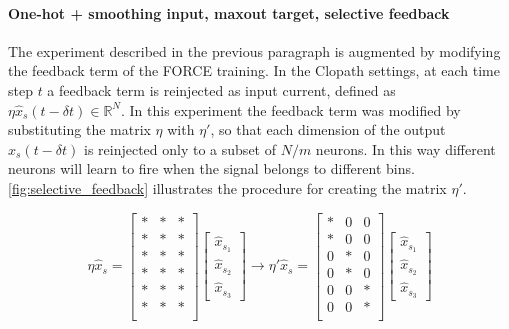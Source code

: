 \documentclass[10pt,a4paper, final]{report} %
\begin{document}
\paragraph{One-hot + smoothing input, maxout target, selective feedback}
The experiment described in the previous paragraph is augmented by modifying the feedback term of the FORCE training. In the Clopath settings, at each time step $t$ a feedback term is reinjected as input current, defined as $\eta \hat{x}_s(t-\delta t) \in \mathbb{R}^N$. In this experiment the feedback term was modified by substituting the matrix $\eta$ with $\eta'$, so that each dimension of the output $\hat{x}_s(t-\delta t)$ is reinjected only to a subset of $N/m$ neurons. In this way different neurons will learn to fire when the signal belongs to different bins. \autoref{fig:selective_feedback} illustrates the procedure for creating the matrix $\eta'$.

\begin{equation}
\eta \hat{x}_s = 
\left[
\begin{array}{cccc}
* & * & * \\
* & * & * \\
* & * & * \\
* & * & * \\
* & * & * \\
* & * & * \\
\end{array}
\right]
\begin{bmatrix}
           \hat{x}_{s_1} \\
           \hat{x}_{s_2} \\
           \hat{x}_{s_3}
\end{bmatrix}
\longrightarrow
\eta' \hat{x}_s = 
\left[
\begin{array}{cccc}
* & 0 & 0 \\
* & 0 & 0\\
\hline
0 & * & 0\\
0 & * & 0\\
\hline
0 & 0 & * \\
0 & 0 & * \\
\end{array}
\right]
\begin{bmatrix}
           \hat{x}_{s_1} \\
           \hat{x}_{s_2} \\
           \hat{x}_{s_3}
\end{bmatrix}        \nonumber
\end{equation}
\label{fig:selective_feedback}
\end{document}
